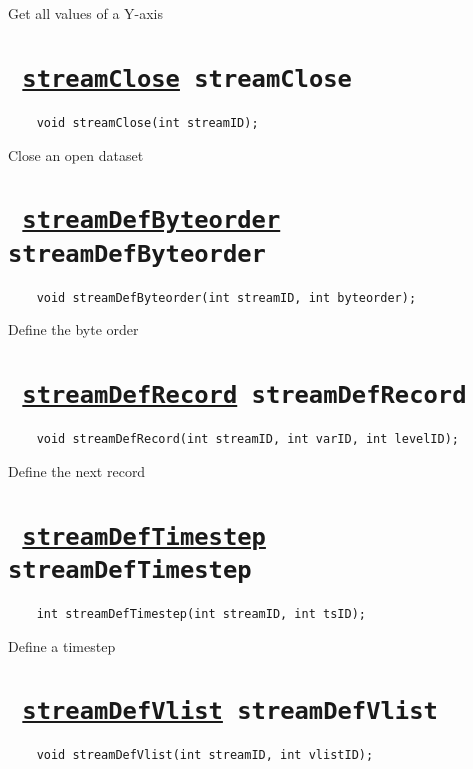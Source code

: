 Get all values of a Y-axis
\ifpdfoutput{}{(\ref{gridInqYvals})}


\section*{\texttt{ 
\ifpdf
\hyperref[streamClose]{streamClose}
\else
streamClose
\fi
}}
\begin{verbatim}
    void streamClose(int streamID);
\end{verbatim}

Close an open dataset
\ifpdfoutput{}{(\ref{streamClose})}


\section*{\texttt{ 
\ifpdf
\hyperref[streamDefByteorder]{streamDefByteorder}
\else
streamDefByteorder
\fi
}}
\begin{verbatim}
    void streamDefByteorder(int streamID, int byteorder);
\end{verbatim}

Define the byte order
\ifpdfoutput{}{(\ref{streamDefByteorder})}


\section*{\texttt{ 
\ifpdf
\hyperref[streamDefRecord]{streamDefRecord}
\else
streamDefRecord
\fi
}}
\begin{verbatim}
    void streamDefRecord(int streamID, int varID, int levelID);
\end{verbatim}

Define the next record
\ifpdfoutput{}{(\ref{streamDefRecord})}


\section*{\texttt{ 
\ifpdf
\hyperref[streamDefTimestep]{streamDefTimestep}
\else
streamDefTimestep
\fi
}}
\begin{verbatim}
    int streamDefTimestep(int streamID, int tsID);
\end{verbatim}

Define a timestep
\ifpdfoutput{}{(\ref{streamDefTimestep})}


\section*{\texttt{ 
\ifpdf
\hyperref[streamDefVlist]{streamDefVlist}
\else
streamDefVlist
\fi
}}
\begin{verbatim}
    void streamDefVlist(int streamID, int vlistID);
\end{verbatim}

